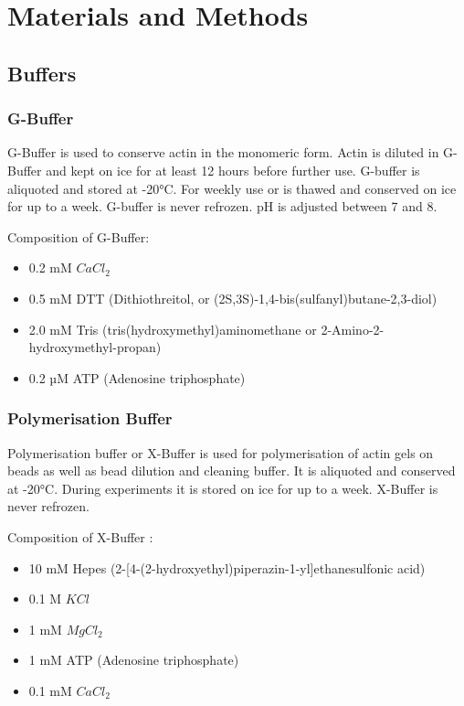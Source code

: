 \documentclass[A4paperpaper,11pt,english]{sphinxmanual}
\begin{document}
\chapter{Materials and Methods}
\label{index-latex:part2}\label{index-latex::doc}\label{index-latex:m-et-m}\label{index-latex:materials-and-methods}

\section{Buffers}
\label{index-latex:buffers}

\subsection{G-Buffer}
\label{index-latex:g-buffer}
G-Buffer is used to conserve actin in the monomeric form. Actin is diluted in
G-Buffer and kept on ice for at least 12 hours before further use. G-buffer is
aliquoted and stored at -20°C. For weekly use or is thawed and conserved on ice for up to a week. G-buffer is never
refrozen. pH is adjusted between 7 and 8.

Composition of G-Buffer:
\begin{itemize}
\item {} 
0.2 mM \(CaCl_2\)

\item {} 
0.5 mM DTT (Dithiothreitol, or (2S,3S)-1,4-bis(sulfanyl)butane-2,3-diol)

\item {} 
2.0 mM Tris (tris(hydroxymethyl)aminomethane or 2-Amino-2-hydroxymethyl-propan)

\item {} 
0.2 µM ATP (Adenosine triphosphate)

\end{itemize}


\subsection{Polymerisation Buffer}
\label{index-latex:polymerisation-buffer}
Polymerisation buffer or X-Buffer is used for polymerisation of actin gels on
beads  as well as bead dilution and cleaning buffer.  It is aliquoted and conserved at
-20°C. During experiments it is stored on ice for up to a week. X-Buffer is never
refrozen.

Composition of X-Buffer :
\begin{itemize}
\item {} 
10 mM Hepes (2-{[}4-(2-hydroxyethyl)piperazin-1-yl{]}ethanesulfonic acid)

\item {} 
0.1 M \(KCl\)

\item {} 
1 mM \(MgCl_2\)

\item {} 
1 mM ATP (Adenosine triphosphate)

\item {} 
0.1 mM \(CaCl_2\)

\end{itemize}
\end{document}
